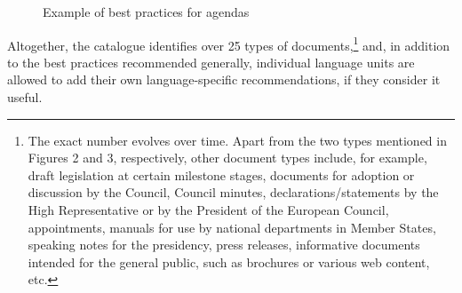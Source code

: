 \documentclass[output=paper]{langsci/langscibook}
\begin{document}
\begin{figure}
\caption{Example of best practices for agendas}
\label{fig:key:3}

\end{figure}

Altogether, the catalogue identifies over 25 types of documents,\footnote{The exact number evolves over time. Apart from the two types mentioned in Figures 2 and 3, respectively, other document types include, for example, draft legislation at certain milestone stages, documents for adoption or discussion by the Council, Council minutes, declarations/statements by the High Representative or by the President of the European Council, appointments, manuals for use by national departments in Member States, speaking notes for the presidency, press releases, informative documents intended for the general public, such as brochures or various web content, etc.} and, in addition to the best practices recommended generally, individual language units are allowed to add their own language-specific recommendations, if they consider it useful.
\end{document}
